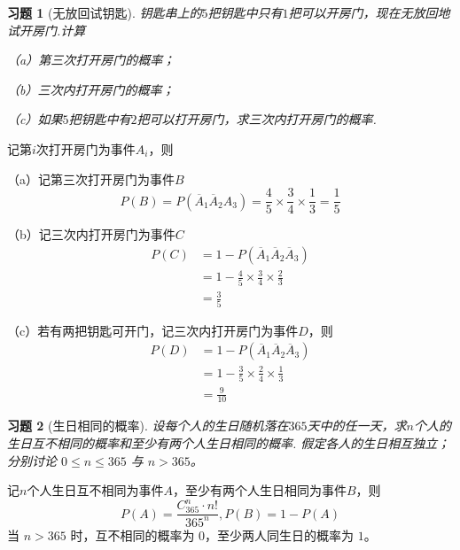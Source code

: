 \documentclass[12pt,fontset=fandol]{ctexart}
\newtheorem{exercise}{习题}[section]
\begin{document}
\begin{exercise}[无放回试钥匙]\label{q:Y1.7}
钥匙串上的$5$把钥匙中只有$1$把可以开房门，现在无放回地试开房门.计算

（a）第三次打开房门的概率；

（b）三次内打开房门的概率；

（c）如果$5$把钥匙中有$2$把可以打开房门，求三次内打开房门的概率.\par{}
\end{exercise}

\begin{solve}\label{a:Y1.7}
记第$i$次打开房门为事件$A_i$，则

（a）记第三次打开房门为事件$B$
\[P(B)=P({\overline A _1}{\overline A _2}{A_3}) = \frac{4}{5} \times \frac{3}{4} \times \frac{1}{3} = \frac{1}{5}\]

（b）记三次内打开房门为事件$C$
\[\begin{aligned}P(C) &= 1 - P({\overline A _1}{\overline A _2}{\overline A _3}) \\&= 1 - \frac{4}{5} \times \frac{3}{4} \times \frac{2}{3} \\&= \frac{3}{5}\end{aligned}\]

（c）若有两把钥匙可开门，记三次内打开房门为事件$D$，则
\[\begin{aligned}P(D) &= 1 - P({\overline A _1}{\overline A _2}{\overline A _3}) \\&= 1 - \frac{3}{5} \times \frac{2}{4} \times \frac{1}{3} \\&= \frac{9}{{10}}\end{aligned}\]
\end{solve}

\begin{exercise}[生日相同的概率]\label{q:Y1.8}
设每个人的生日随机落在$365$天中的任一天，求$n$个人的生日互不相同的概率和至少有两个人生日相同的概率. 假定各人的生日相互独立；分别讨论 $0\le n\le365$ 与 $n>365$。\par{}
\end{exercise}

\begin{solve}\label{a:Y1.8}
记$n$个人生日互不相同为事件$A$，至少有两个人生日相同为事件$B$，则
\[P(A) = \frac{{C_{365}^n}\cdot n!}{{{{365}^n}}},P(B) = 1 - P(A)\]
 当 $n>365$ 时，互不相同的概率为 $0$，至少两人同生日的概率为 $1$。\end{solve}
\end{document}

